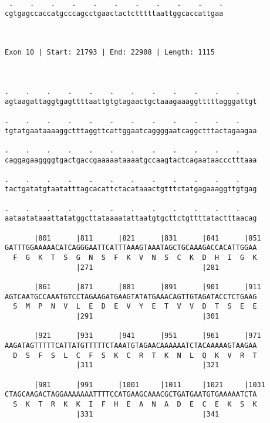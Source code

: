 \documentclass{article}
\begin{document}
\begin{Verbatim}
 .    .    .    .    .    .    .    .    .    .    .
cgtgagccaccatgcccagcctgaactactctttttaattggcaccattgaa
                                                    
                                                    
 
Exon 10 | Start: 21793 | End: 22908 | Length: 1115



.    .    .    .    .    .    .    .    .    .    .    .    
agtaagattaggtgagttttaattgtgtagaactgctaaagaaaggtttttagggattgt
                                                            
.    .    .    .    .    .    .    .    .    .    .    .    
tgtatgaataaaaggctttaggttcattggaatcaggggaatcaggctttactagaagaa
                                                            
.    .    .    .    .    .    .    .    .    .    .    .    
caggagaaggggtgactgaccgaaaaataaaatgccaagtactcagaataaccctttaaa
                                                            
.    .    .    .    .    .    .    .    .    .    .    .    
tactgatatgtaatatttagcacattctacataaactgtttctatgagaaaggttgtgag
                                                            
.    .    .    .    .    .    .    .    .    .    .    .    
aataatataaattatatggcttataaaatattaatgtgcttctgttttatactttaacag
                                                            
       |801      |811      |821      |831      |841      |851
GATTTGGAAAAACATCAGGGAATTCATTTAAAGTAAATAGCTGCAAAGACCACATTGGAA
  F  G  K  T  S  G  N  S  F  K  V  N  S  C  K  D  H  I  G  K
                 |271                          |281         
  
       |861      |871      |881      |891      |901      |911
AGTCAATGCCAAATGTCCTAGAAGATGAAGTATATGAAACAGTTGTAGATACCTCTGAAG
  S  M  P  N  V  L  E  D  E  V  Y  E  T  V  V  D  T  S  E  E
                 |291                          |301         
  
       |921      |931      |941      |951      |961      |971
AAGATAGTTTTTCATTATGTTTTTCTAAATGTAGAACAAAAAATCTACAAAAAGTAAGAA
  D  S  F  S  L  C  F  S  K  C  R  T  K  N  L  Q  K  V  R  T
                 |311                          |321         
  
       |981      |991      |1001     |1011     |1021     |1031
CTAGCAAGACTAGGAAAAAAATTTTCCATGAAGCAAACGCTGATGAATGTGAAAAATCTA
  S  K  T  R  K  K  I  F  H  E  A  N  A  D  E  C  E  K  S  K
                 |331                          |341         
  

\end{Verbatim}
\end{document}

